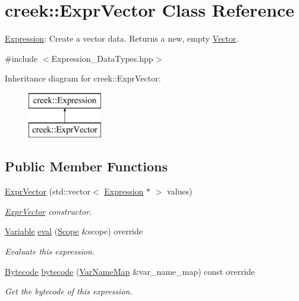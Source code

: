 \hypertarget{classcreek_1_1_expr_vector}{}\section{creek\+:\+:Expr\+Vector Class Reference}
\label{classcreek_1_1_expr_vector}


\hyperlink{classcreek_1_1_expression}{Expression}\+: Create a vector data. Returns a new, empty {\ttfamily \hyperlink{classcreek_1_1_vector}{Vector}}.  




{\ttfamily \#include $<$Expression\+\_\+\+Data\+Types.\+hpp$>$}

Inheritance diagram for creek\+:\+:Expr\+Vector\+:\begin{figure}[H]
\begin{center}
\leavevmode
\includegraphics[height=2.000000cm]{classcreek_1_1_expr_vector}
\end{center}
\end{figure}
\subsection*{Public Member Functions}
\begin{DoxyCompactItemize}
\item 
\hyperlink{classcreek_1_1_expr_vector_ac3aa0f9efb744cde52cf8bf7c3fc6f27}{Expr\+Vector} (std\+::vector$<$ \hyperlink{classcreek_1_1_expression}{Expression} $\ast$ $>$ values)
\begin{DoxyCompactList}\small\item\em {\ttfamily \hyperlink{classcreek_1_1_expr_vector}{Expr\+Vector}} constructor. \end{DoxyCompactList}\item 
\hyperlink{classcreek_1_1_variable}{Variable} \hyperlink{classcreek_1_1_expr_vector_a10281fdb5c4f552c8f7d2abf85067315}{eval} (\hyperlink{classcreek_1_1_scope}{Scope} \&scope) override
\begin{DoxyCompactList}\small\item\em Evaluate this expression. \end{DoxyCompactList}\item 
\hyperlink{classcreek_1_1_bytecode}{Bytecode} \hyperlink{classcreek_1_1_expr_vector_a1f7035f837651f6c0c37d4b2d700636b}{bytecode} (\hyperlink{classcreek_1_1_var_name_map}{Var\+Name\+Map} \&var\+\_\+name\+\_\+map) const  override\hypertarget{classcreek_1_1_expr_vector_a1f7035f837651f6c0c37d4b2d700636b}{}\label{classcreek_1_1_expr_vector_a1f7035f837651f6c0c37d4b2d700636b}

\begin{DoxyCompactList}\small\item\em Get the bytecode of this expression. \end{DoxyCompactList}\end{DoxyCompactItemize}



